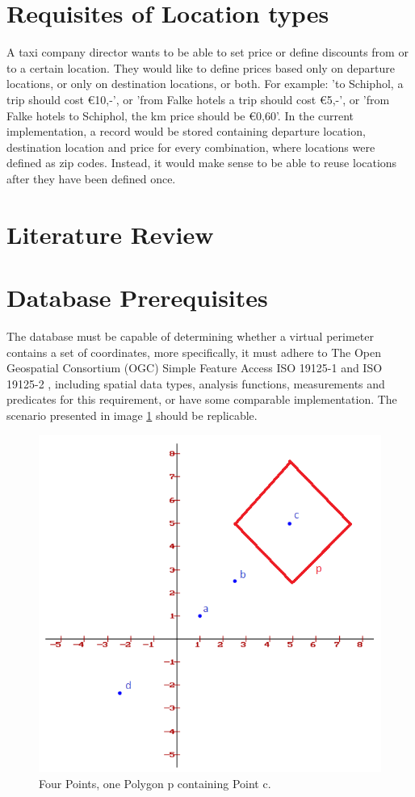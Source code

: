 %
\section{Requisites of Location types}
A taxi company director wants to be able to set price or define discounts from or to a certain location. They would like to define prices based only on departure locations, or only on destination locations, or both. For example: 'to Schiphol, a trip should cost \euro 10,-', or 'from Falke hotels a trip should cost \euro 5,-', or 'from Falke hotels to Schiphol, the km price should be \euro 0,60'. In the current implementation, a record would be stored containing departure location, destination location and price for every combination, where locations were defined as zip codes. Instead, it would make sense to be able to reuse locations after they have been defined once.

%
\section{Literature Review}

%
\section{Database Prerequisites}
The database must be capable of determining whether a virtual perimeter contains a set of coordinates, more specifically, it must adhere to The Open Geospatial Consortium (OGC) Simple Feature Access ISO 19125-1 \cite{SFA} and ISO 19125-2 \cite{SFS}, including spatial data types, analysis functions, measurements and predicates for this requirement, or have some comparable implementation. The scenario presented in image \ref{fig:square} should be replicable.

\begin{figure}[htbp!]
	\centering
	\includegraphics[width=.5\textwidth]{Square}
	\caption[Square]{Four Points, one Polygon p containing Point c.}
	\label{fig:square}
\end{figure}

